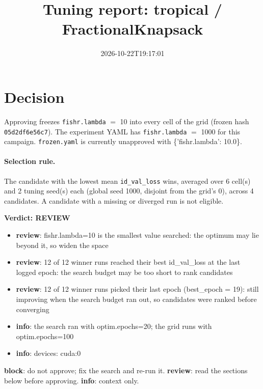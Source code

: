 \documentclass[10pt]{article}
\title{Tuning report: tropical / FractionalKnapsack}
\date{2026-10-22T19:17:01}
\begin{document}
\maketitle

\section{Decision}
Approving freezes
\texttt{fishr.lambda} $=$ 10 into every cell of the grid (frozen hash \texttt{05d2df6e56c7}).
The experiment YAML has
\texttt{fishr.lambda} $=$ 1000 for this campaign.
\texttt{frozen.yaml} is currently unapproved with \{'fishr.lambda': 10.0\}.

\paragraph{Selection rule.} The candidate with the lowest mean \texttt{id\_val\_loss} wins, averaged over 6 cell(s) and 2 tuning seed(s) each (global seed 1000, disjoint from the grid's 0), across 4 candidates. A candidate with a missing or diverged run is not eligible.

\begin{framed}
\noindent\textbf{Verdict: \textcolor{orange!85!black}{REVIEW}}
\begin{itemize}\setlength\itemsep{0pt}
\item \textbf{review}: fishr.lambda=10 is the smallest value searched: the optimum may lie beyond it, so widen the space
\item \textbf{review}: 12 of 12 winner runs reached their best id\_val\_loss at the last logged epoch: the search budget may be too short to rank candidates
\item \textbf{review}: 12 of 12 winner runs picked their last epoch (best\_epoch = 19): still improving when the search budget ran out, so candidates were ranked before converging
\item \textbf{info}: the search ran with optim.epochs=20; the grid runs with optim.epochs=100
\item \textbf{info}: devices: cuda:0
\end{itemize}
\end{framed}
\noindent\textbf{block}: do not approve; fix the search and re-run it. \textbf{review}: read the sections below before approving. \textbf{info}: context only.
\end{document}
